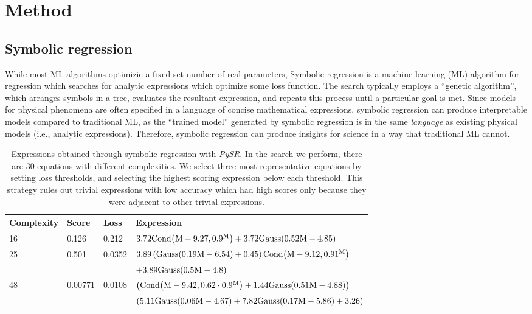 \documentclass[nohyperref]{article}
\newcommand\pysr{\textit{PySR}\xspace}
\theoremstyle{plain}
\theoremstyle{definition}
\theoremstyle{remark}
\begin{document}
\section{Method}
\label{sec:method}

\subsection{Symbolic regression}

While most ML algorithms optimizie a fixed set number of real parameters,
Symbolic regression is a machine learning (ML) algorithm for regression which searches for analytic expressions which optimize some loss function.
The search typically employs a ``genetic algorithm'', which arranges symbols in a tree, evaluates the resultant expression, and repeats this process until a particular goal is met.
Since models for physical phenomena are often specified in a language of concise mathematical expressions, symbolic regression can produce interpretable models compared to traditional ML, as the ``trained model'' generated by symbolic regression is in the same \textit{language} as existing physical models (i.e., analytic expressions).
Therefore, symbolic regression can produce insights for science in a way that traditional ML cannot.

\begin{table*}[hbt!]
    \begin{center}
    \begin{tabular}{ l l l l }
    \hline
    \hline
    Complexity &  Score & Loss & Expression\\
    \hline
    \hline
    16 & 0.126   & 0.212  & $3.72 \rm{Cond}{\left(M - 9.27,0.9^{M} \right)} + 3.72 \rm{Gauss}{\left(0.52 M - 4.85 \right)}$\\
    25 & 0.501   & 0.0352 & $3.89 \left(\rm{Gauss}{\left(0.19 M - 6.54 \right)} + 0.45\right) \rm{Cond}{\left(M - 9.12,0.91^{M} \right)}$\\
    & & & $ + 3.89 \rm{Gauss}{\left(0.5 M - 4.8 \right)}$\\
    48 & 0.00771 & 0.0108 & $\left(\rm{Cond}{\left(M - 9.42,0.62 \cdot 0.9^{M} \right)} + 1.44 \rm{Gauss}{\left(0.51 M - 4.88 \right)}\right)$\\
    & & & $\left(5.11 \rm{Gauss}{\left(0.06 M - 4.67 \right)} + 7.82 \rm{Gauss}{\left(0.17 M - 5.86 \right)} + 3.26\right)$\\
    \hline
    \hline
    \end{tabular}
    \caption{Expressions obtained through symbolic regression with \pysr.
    In the search we perform, there are 30 equations with different complexities.
    We select three most representative equations by setting loss thresholds, and selecting the highest scoring expression below each threshold. This strategy rules out trivial expressions with low accuracy which had high scores only because they were adjacent to other trivial expressions.}
    \label{tab:equations}
    \end{center}
\end{table*}
\end{document}
